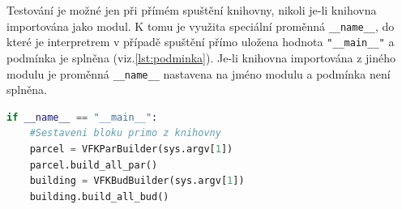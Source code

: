 Testování je možné jen při přímém spuštění knihovny, nikoli je-li
knihovna importována jako modul. K tomu je využita speciální proměnná
\verb|__name__|, do které je interpretrem v případě spuštění přímo
uložena hodnota \verb|"__main__"| a podmínka je
splněna (viz.\ref{lst:podminka}). Je-li knihovna importována z jiného
modulu je proměnná \verb|__name__| nastavena na jméno modulu a
podmínka není splněna.
\begin{lstlisting}[caption=Ukázka sestavení bloků provedeném jen při přímém spuštění knihovny, language=Python, numbers=none, label=lst:podminka]
if __name__ == "__main__":
	#Sestaveni bloku primo z knihovny
    parcel = VFKParBuilder(sys.argv[1])
    parcel.build_all_par()
    building = VFKBudBuilder(sys.argv[1])
    building.build_all_bud()
\end{lstlisting}
